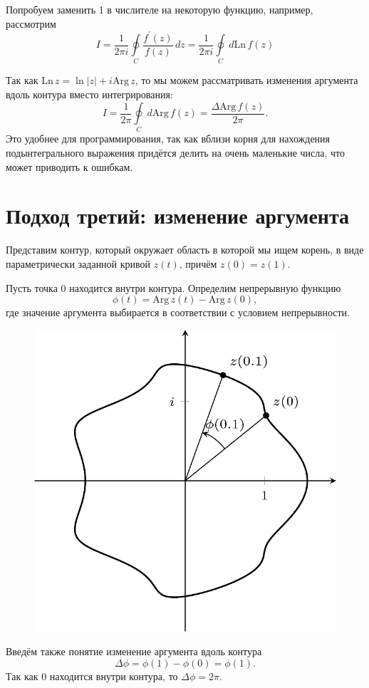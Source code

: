 Попробуем заменить 1  в числителе на некоторую функцию, например, рассмотрим
\[
    I = \frac{1}{2\pi i}\oint\limits_{C} \frac{f^\prime(z)}{f(z)}\,dz =
    \frac{1}{2\pi i}\oint\limits_{C}\, d \mathrm{Ln\,} f(z)
\]

Так как \( \mathrm{Ln\,} z = \ln |z| + i\mathrm{Arg\,} z \), то мы можем рассматривать изменения аргумента вдоль контура вместо интегрирования:
\[
    I = \frac{1}{2\pi}\oint\limits_{C}\, d \mathrm{Arg\,} f(z) = \frac{\Delta\mathrm{Arg\,}f(z)}{2\pi}.
\]
Это удобнее для программирования, так как вблизи корня для нахождения подынтегрального выражения придётся делить на очень маленькие числа, что может приводить к ошибкам.

\section{Подход третий: изменение аргумента}

Представим контур, который окружает область в которой мы ищем корень, в виде
параметрически заданной кривой \( z(t) \), причём \( z(0) = z(1) \).

Пусть точка \( 0 \) находится внутри контура. Определим непрерывную функцию
\[
    \phi(t) = \mathrm{Arg\,} z(t) - \mathrm{Arg\,} z(0),
\]
где значение аргумента выбирается в соответствии с условием непрерывности.
\begin{figure}[h]
\center
\includegraphics[width=.5\textwidth]{2015-10-26-complex-roots-contour.png}
\end{figure}
Введём также понятие изменение аргумента вдоль контура
\[
    \Delta \phi = \phi(1) - \phi(0) = \phi(1).
\]
Так как \(0\) находится внутри контура, то \( \Delta\phi = 2\pi \).

